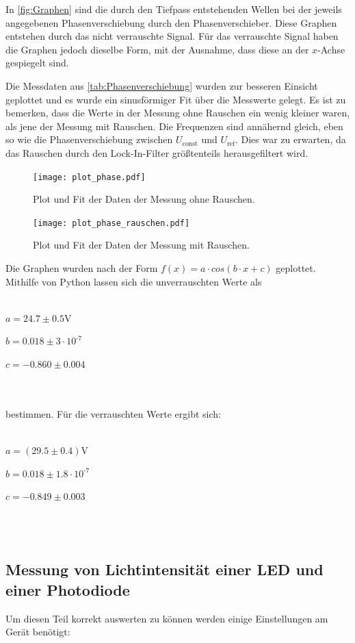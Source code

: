 In \ref{fig:Graphen} sind die durch den Tiefpass entstehenden Wellen bei der jeweils angegebenen Phasenverschiebung durch den Phasenverschieber. Diese Graphen entstehen durch das nicht verrauschte Signal.
Für das verrauschte Signal haben die Graphen jedoch dieselbe Form, mit der Ausnahme, dass diese an der $x$-Achse gespiegelt sind.

Die Messdaten aus \ref{tab:Phasenverschiebung} wurden zur besseren Einsicht geplottet und es wurde ein sinusförmiger Fit über die Messwerte gelegt.
Es ist zu bemerken, dass die Werte in der Messung ohne Rauschen ein wenig kleiner waren, als jene der Messung mit Rauschen.
Die Frequenzen sind annähernd gleich, eben so wie die Phasenverschiebung zwischen $U_\text{const}$ und $U_\text{ref}$. Dies war zu erwarten, da das Rauschen durch den Lock-In-Filter größtenteils herausgefiltert wird.

\begin{figure}
  \centering
  \texttt{[image: plot\_phase.pdf]}
  \caption{Plot und Fit der Daten der Messung ohne Rauschen.}
  \label{fig:plot_phase}
\end{figure}

\begin{figure}
  \centering
  \texttt{[image: plot\_phase\_rauschen.pdf]}
  \caption{Plot und Fit der Daten der Messung mit Rauschen.}
  \label{fig:plot_phase_rauschen}
\end{figure}

Die Graphen wurden nach der Form $f(x)=a\cdot cos(b\cdot x+c)$ geplottet. Mithilfe von Python lassen sich die unverrauschten Werte als
\\ \\
\centerline{$a=24.7 \pm 0.5$V}
\centerline{$b=0.018 \pm 3\cdot 10^\text{-7}$}
\centerline{$c=-0.860 \pm 0.004$}
\\ \\
bestimmen. Für die verrauschten Werte ergibt sich:
\\ \\
\centerline{$a=(29.5 \pm 0.4)$V}
\centerline{$b=0.018 \pm 1.8\cdot 10^\text{-7}$}
\centerline{$c=-0.849 \pm 0.003$}
\\ \\
\subsection{Messung von Lichtintensität einer LED und einer Photodiode}

Um diesen Teil korrekt auswerten zu können werden einige Einstellungen am Gerät benötigt:

